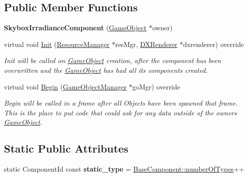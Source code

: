 \subsection*{Public Member Functions}
\begin{DoxyCompactItemize}
\item 
\mbox{\label{classSkyboxIrradianceComponent_ad2bccd8dec83d3e0f431ed4a7b27d981}} 
{\bfseries Skybox\+Irradiance\+Component} (\hyperlink{classGameObject}{Game\+Object} $\ast$owner)
\item 
virtual void \hyperlink{classSkyboxIrradianceComponent_acb579a9a034d27a66da83960a973ea25}{Init} (\hyperlink{classResourceManager}{Resource\+Manager} $\ast$res\+Mgr, \hyperlink{classDXRenderer}{D\+X\+Renderer} $\ast$dxrenderer) override
\begin{DoxyCompactList}\small\item\em Init will be called on \hyperlink{classGameObject}{Game\+Object} creation, after the component has been overwritten and the \hyperlink{classGameObject}{Game\+Object} has had all its components created. \end{DoxyCompactList}\item 
virtual void \hyperlink{classSkyboxIrradianceComponent_a39357a3138b9727a31df30f2b8f2a42d}{Begin} (\hyperlink{classGameObjectManager}{Game\+Object\+Manager} $\ast$go\+Mgr) override
\begin{DoxyCompactList}\small\item\em Begin will be called in a frame after all Objects have been spawned that frame. This is the place to put code that could ask for any data outside of the owner\textquotesingle{}s \hyperlink{classGameObject}{Game\+Object}. \end{DoxyCompactList}\end{DoxyCompactItemize}
\subsection*{Static Public Attributes}
\begin{DoxyCompactItemize}
\item 
\mbox{\label{classSkyboxIrradianceComponent_a8b75ec924103eae4f89b83d0531847ac}} 
static Component\+Id const {\bfseries static\+\_\+type} = \hyperlink{classBaseComponent_a084ade347bc71a7f0d3b17ecdc2225a4}{Base\+Component\+::number\+Of\+Types}++
\end{DoxyCompactItemize}
